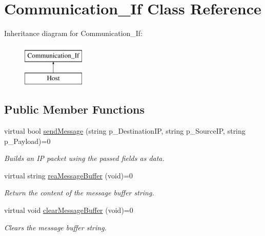\hypertarget{classCommunication__If}{\section{Communication\-\_\-\-If Class Reference}
\label{classCommunication__If}
}
Inheritance diagram for Communication\-\_\-\-If\-:\begin{figure}[H]
\begin{center}
\leavevmode
\includegraphics[height=2.000000cm]{classCommunication__If}
\end{center}
\end{figure}
\subsection*{Public Member Functions}
\begin{DoxyCompactItemize}
\item 
virtual bool \hyperlink{classCommunication__If_ab9c0279d64e4ce15b2f54c0df6d8ee3a}{send\-Message} (string p\-\_\-\-Destination\-I\-P, string p\-\_\-\-Source\-I\-P, string p\-\_\-\-Payload)=0
\begin{DoxyCompactList}\small\item\em Builds an I\-P packet using the passed fields as data. \end{DoxyCompactList}\item 
virtual string \hyperlink{classCommunication__If_a6a6083e9f88d3bd0897ccd1c6448f9c8}{rea\-Message\-Buffer} (void)=0
\begin{DoxyCompactList}\small\item\em Return the content of the message buffer string. \end{DoxyCompactList}\item 
\hypertarget{classCommunication__If_ad0a41ea2bebc146be6ee6db89d49486d}{virtual void \hyperlink{classCommunication__If_ad0a41ea2bebc146be6ee6db89d49486d}{clear\-Message\-Buffer} (void)=0}\label{classCommunication__If_ad0a41ea2bebc146be6ee6db89d49486d}

\begin{DoxyCompactList}\small\item\em Clears the message buffer string. \end{DoxyCompactList}\end{DoxyCompactItemize}


